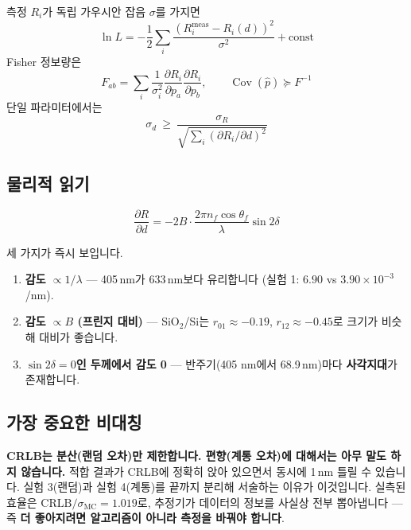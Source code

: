 \documentclass[10pt,a4paper]{article}
\newcommand{\note}[1]{%
  \begin{tcolorbox}[enhanced,breakable,colback=white,colframe=accent,
    boxrule=0pt,leftrule=1.6pt,arc=0pt,outer arc=0pt,
    left=6pt,right=2pt,top=3pt,bottom=3pt,boxsep=0pt,
    before skip=5pt, after skip=8pt]
  #1
  \end{tcolorbox}}
\begin{document}
측정 $R_i$가 독립 가우시안 잡음 $\sigma$를 가지면
\begin{equation}
\ln L = -\frac12\sum_i\frac{(R_i^{\text{meas}}-R_i(d))^2}{\sigma^2}+\text{const}
\end{equation}
Fisher 정보량은
\begin{equation}
F_{ab} = \sum_i\frac{1}{\sigma_i^2}\frac{\partial R_i}{\partial p_a}\frac{\partial R_i}{\partial p_b},
\qquad \operatorname{Cov}(\hat p)\succeq F^{-1}
\end{equation}
단일 파라미터에서는
\begin{equation}
\boxed{\;\sigma_d \ \ge\ \frac{\sigma_R}{\sqrt{\sum_i(\partial R_i/\partial d)^2}}\;}
\end{equation}

\subsection{물리적 읽기}

\begin{equation}
\frac{\partial R}{\partial d} = -2B\cdot\frac{2\pi n_f\cos\theta_f}{\lambda}\sin2\delta
\end{equation}

세 가지가 즉시 보입니다.

\begin{enumerate}[leftmargin=16pt,itemsep=1pt]
\item \textbf{감도 $\propto 1/\lambda$} — 405\,nm가 633\,nm보다 유리합니다 (실험 1: $6.90$ vs $3.90\times10^{-3}$/nm).
\item \textbf{감도 $\propto B$ (프린지 대비)} — SiO$_2$/Si는 $r_{01}\approx-0.19$, $r_{12}\approx-0.45$로 크기가 비슷해 대비가 좋습니다.
\item \textbf{$\sin2\delta=0$인 두께에서 감도 0} — 반주기(405 nm에서 68.9\,nm)마다 \textbf{사각지대}가 존재합니다.
\end{enumerate}

\subsection{가장 중요한 비대칭}

\note{\textbf{CRLB는 분산(랜덤 오차)만 제한합니다. 편향(계통 오차)에 대해서는 아무 말도 하지 않습니다.} 적합 결과가 CRLB에 정확히 앉아 있으면서 동시에 1\,nm 틀릴 수 있습니다. 실험 3(랜덤)과 실험 4(계통)를 끝까지 분리해 서술하는 이유가 이것입니다. 실측된 효율은 $\text{CRLB}/\sigma_{\text{MC}} = 1.019$로, 추정기가 데이터의 정보를 사실상 전부 뽑아냅니다 — 즉 \textbf{더 좋아지려면 알고리즘이 아니라 측정을 바꿔야 합니다}.}
\end{document}
